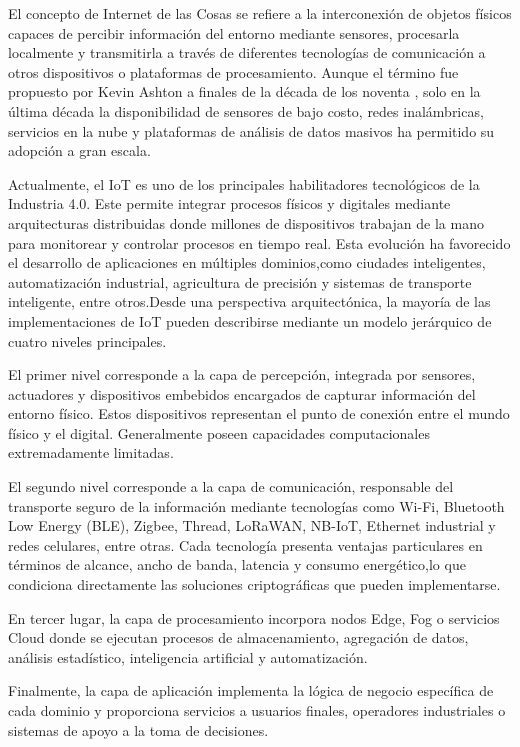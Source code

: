 El concepto de Internet de las Cosas se refiere a la interconexión de objetos físicos capaces de percibir información del entorno mediante sensores, procesarla localmente y transmitirla a través de diferentes tecnologías de comunicación a otros dispositivos o plataformas de procesamiento. Aunque el término fue propuesto por Kevin Ashton a finales de la década de los noventa \cite{Dhanda2020LightweightIoT}, solo en la última década la disponibilidad de sensores de bajo costo, redes inalámbricas, servicios en la nube y plataformas de análisis de datos masivos ha permitido su adopción a gran escala.

Actualmente, el IoT es uno de los principales habilitadores tecnológicos de la Industria 4.0. Este permite integrar procesos físicos y digitales mediante arquitecturas distribuidas donde  millones de dispositivos trabajan de la mano para monitorear y controlar procesos en tiempo real. Esta evolución ha favorecido el desarrollo de aplicaciones en múltiples dominios,como ciudades inteligentes, automatización industrial, agricultura de precisión y sistemas de transporte inteligente, entre otros.Desde una perspectiva arquitectónica, la mayoría de las implementaciones de IoT pueden describirse mediante un modelo jerárquico de cuatro niveles principales.

El primer nivel corresponde a la capa de percepción, integrada por sensores, actuadores y dispositivos embebidos encargados de capturar información del entorno físico. Estos dispositivos representan el punto de conexión entre el mundo físico y el digital. Generalmente poseen capacidades computacionales extremadamente limitadas.

El segundo nivel corresponde a la capa de comunicación, responsable del transporte seguro de la información mediante tecnologías como Wi-Fi, Bluetooth Low Energy (BLE), Zigbee, Thread, LoRaWAN, NB-IoT, Ethernet industrial y redes celulares, entre otras. Cada tecnología presenta ventajas particulares en términos de alcance, ancho de banda, latencia y consumo energético,lo que condiciona directamente las soluciones criptográficas que pueden implementarse.

En tercer lugar, la capa de procesamiento incorpora nodos Edge, Fog o servicios Cloud donde se ejecutan procesos de almacenamiento, agregación de datos, análisis estadístico, inteligencia artificial y automatización.

Finalmente, la capa de aplicación implementa la lógica de negocio específica de cada dominio y proporciona servicios a usuarios finales, operadores industriales o sistemas de apoyo a la toma de decisiones.

